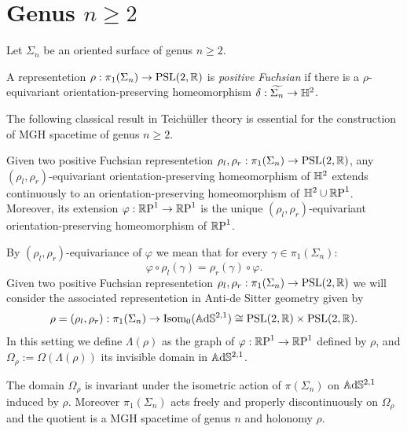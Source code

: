 \section{Genus $n\geq 2$}
Let $\Sigma_n$ be an oriented surface of genus $n\geq 2$.
\begin{definition}
    A representetion $\rho: \pi_1(\Sigma_n) \to \PSL$ is \textit{positive Fuchsian} if there is a $\rho$-equivariant orientation-preserving homeomorphism $\delta : \widetilde{\Sigma_n}\to\H^2$.
\end{definition}
The following classical result in Teich\"uller theory is essential for the construction of MGH spacetime of genus $n\geq 2$.
\begin{lemma}
    Given two positive Fuchsian representetion $\rho_l, \rho_r : \pi_1(\Sigma_n) \to \PSL$, any $(\rho_l, \rho_r)$-equivariant orientation-preserving homeomorphism of $\H^2$ extends continuously to an orientation-preserving homeomorphism of $\H^2\cup\S$. Moreover, its extension $\varphi : \S\to\S$ is the unique $(\rho_l, \rho_r)$-equivariant orientation-preserving homeomorphism of $\S$.
\end{lemma}
By $(\rho_l, \rho_r)$-equivariance of $\varphi$ we mean that for every $\gamma \in \pi_1(\Sigma_n)$:
\begin{equation} \label{eq:equivariance}
    \varphi \circ \rho_l(\gamma) = \rho_r(\gamma)\circ\varphi.
\end{equation}
Given two positive Fuchsian representetion $\rho_l, \rho_r : \pi_1(\Sigma_n) \to \PSL$ we will consider the associated representetion in Anti-de Sitter geometry given by
\[
    \rho = (\rho_l, \rho_r) : \pi_1(\Sigma_n) \to \text{Isom}_0(\A^{2,1}) \cong \PSL \times \PSL.
\]
In this setting we define $\Lambda(\rho)$ as the graph of $\varphi: \S\to\S$ defined by $\rho$, and $\Omega_\rho := \Omega(\Lambda(\rho))$ its invisible domain in $\A^{2,1}$.
\begin{proposition} \label{prop:MGH_example}
    The domain $\Omega_\rho$ is invariant under the isometric action of $\pi(\Sigma_n)$ on $\A^{2,1}$ induced by $\rho$. Moreover $\pi_1(\Sigma_n)$ acts freely and properly discontinuously on $\Omega_\rho$ and the quotient is a MGH spacetime of genus $n$ and holonomy $\rho$.
\end{proposition}
